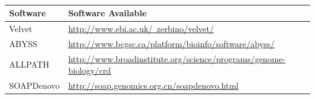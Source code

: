 \documentclass{article}
\begin{document}
\begin{table}[ht]
\begin{center}
\caption{}\label{links_of_assemblers}
\begin{tabular}{l|l}
\hline
Software &Software Available\\
\hline
Velvet &\href{http://www.ebi.ac.uk/~zerbino/velvet/}{http://www.ebi.ac.uk/~zerbino/velvet/}\\
\hline
ABYSS &\href{http://www.bcgsc.ca/platform/bioinfo/software/abyss/}{http://www.bcgsc.ca/platform/bioinfo/software/abyss/}\\
\hline
ALLPATH &\href{http://www.broadinstitute.org/science/programs/genome-biology/crd}{http://www.broadinstitute.org/science/programs/genome-biology/crd}\\
\hline
SOAPDenovo &\href{http://soap.genomics.org.cn/soapdenovo.html}{http://soap.genomics.org.cn/soapdenovo.html}\\
\hline
\end{tabular}
\end{center}
\end{table}

\renewcommand\refname{Reference}


\end{document}
